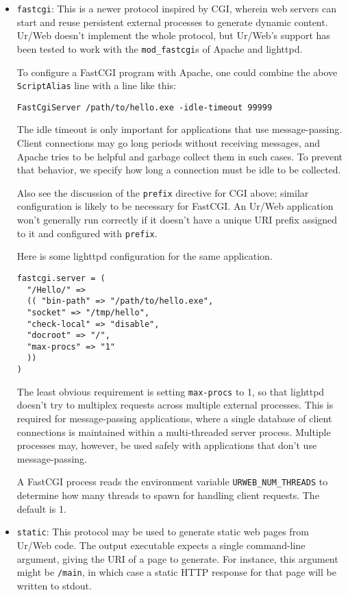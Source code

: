 \documentclass{article}
\newcommand{\cd}[1]{\texttt{#1}}
\begin{document}
\begin{itemize}
\begin{itemize}
  \item \texttt{fastcgi}: This is a newer protocol inspired by CGI, wherein web servers can start and reuse persistent external processes to generate dynamic content.  Ur/Web doesn't implement the whole protocol, but Ur/Web's support has been tested to work with the \texttt{mod\_fastcgi}s of Apache and lighttpd.

    To configure a FastCGI program with Apache, one could combine the above \texttt{ScriptAlias} line with a line like this:
    \begin{verbatim}
FastCgiServer /path/to/hello.exe -idle-timeout 99999
    \end{verbatim}
    The idle timeout is only important for applications that use message-passing.  Client connections may go long periods without receiving messages, and Apache tries to be helpful and garbage collect them in such cases.  To prevent that behavior, we specify how long a connection must be idle to be collected.

    Also see the discussion of the \cd{prefix} directive for CGI above; similar configuration is likely to be necessary for FastCGI.  An Ur/Web application won't generally run correctly if it doesn't have a unique URI prefix assigned to it and configured with \cd{prefix}.

    Here is some lighttpd configuration for the same application.
    \begin{verbatim}
fastcgi.server = (
  "/Hello/" =>
  (( "bin-path" => "/path/to/hello.exe",
  "socket" => "/tmp/hello",
  "check-local" => "disable",
  "docroot" => "/",
  "max-procs" => "1"
  ))
)
    \end{verbatim}
    The least obvious requirement is setting \texttt{max-procs} to 1, so that lighttpd doesn't try to multiplex requests across multiple external processes.  This is required for message-passing applications, where a single database of client connections is maintained within a multi-threaded server process.  Multiple processes may, however, be used safely with applications that don't use message-passing.

    A FastCGI process reads the environment variable \texttt{URWEB\_NUM\_THREADS} to determine how many threads to spawn for handling client requests.  The default is 1.

  \item \texttt{static}: This protocol may be used to generate static web pages from Ur/Web code.  The output executable expects a single command-line argument, giving the URI of a page to generate.  For instance, this argument might be \cd{/main}, in which case a static HTTP response for that page will be written to stdout.
  \end{itemize}


\end{itemize}
\end{document}
